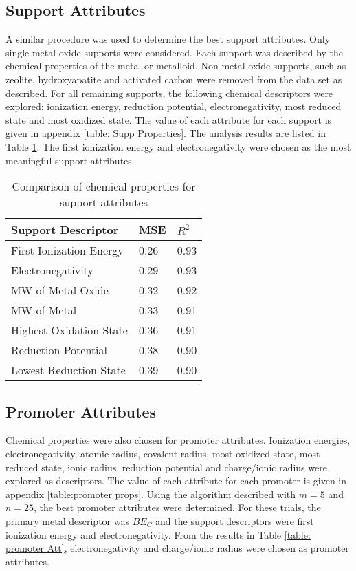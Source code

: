 	\subsection{Support Attributes}
	A similar procedure was used to determine the best support attributes. Only single metal oxide supports were considered. Each support was described by the chemical properties of the metal or metalloid. Non-metal oxide supports, such as zeolite, hydroxyapatite and activated carbon were removed from the data set as described. For all remaining supports, the following chemical descriptors were explored: ionization energy, reduction potential, electronegativity, most reduced state and most oxidized state. The value of each attribute for each support is given in appendix \ref{table: Supp Properties}. The analysis results are listed in Table \ref{table: supports}. The first ionization energy and electronegativity were chosen as the most meaningful support attributes. 
			\begin{table}[ht]
				\centering
				\caption{Comparison of chemical properties for support attributes}
				\label{table: supports}
				\begin{tabular}{lll}
				\textbf{Support Descriptor} & \textbf{MSE} & \textbf{$R^2$} \\ \hline
				First Ionization Energy     & 0.26         & 0.93                         \\
				Electronegativity           & 0.29         & 0.93                         \\
				MW of Metal Oxide           & 0.32         & 0.92                         \\
				MW of Metal                 & 0.33         & 0.91                         \\
				Highest Oxidation State     & 0.36         & 0.91                         \\
				Reduction Potential         & 0.38         & 0.90                         \\
				Lowest Reduction State      & 0.39         & 0.90                        
				\end{tabular}
				\end{table}
	\subsection{Promoter Attributes}
	Chemical properties were also chosen for promoter attributes. Ionization energies, electronegativity, atomic radius, covalent radius, most oxidized state, most reduced state, ionic radius, reduction potential and charge/ionic radius were explored as descriptors. The value of each attribute for each promoter is given in appendix \ref{table:promoter props}. Using the algorithm described with $m = 5$ and $n = 25$, the best promoter attributes were determined. For these trials, the primary metal descriptor was $BE_C$ and the support descriptors were first ionization energy and electronegativity. From the results in Table \ref{table: promoter Att}, electronegativity and charge/ionic radius were chosen as promoter attributes. 

